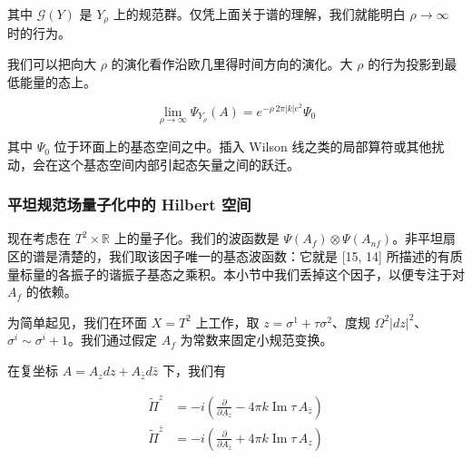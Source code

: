其中 $\mathcal{G}(Y)$ 是 $Y_\rho$ 上的规范群。仅凭上面关于谱的理解，我们就能明白 $\rho\to\infty$ 时的行为。

我们可以把向大 $\rho$ 的演化看作沿欧几里得时间方向的演化。大 $\rho$ 的行为投影到最低能量的态上。

\begin{equation}
  \lim_{\rho\to\infty}\Psi_{Y_\rho}(A)=e^{-\rho\,2\pi|k|e^2}\Psi_0
  \tag{2.193}
  \label{eq:2.193}
\end{equation}

其中 $\Psi_0$ 位于环面上的基态空间之中。插入 Wilson 线之类的局部算符或其他扰动，会在这个基态空间内部引起态矢量之间的跃迁。

\subsubsection*{平坦规范场量子化中的 Hilbert 空间} %

现在考虑在 $T^2\times\mathbb{R}$ 上的量子化。我们的波函数是 $\Psi(A_f)\otimes\Psi(A_{nf})$。非平坦扇区的谱是清楚的，我们取该因子唯一的基态波函数：它就是 [15, 14] 所描述的有质量标量的各振子的谐振子基态之乘积。本小节中我们丢掉这个因子，以便专注于对 $A_f$ 的依赖。

为简单起见，我们在环面 $X=T^2$ 上工作，取 $z=\sigma^1+\tau\sigma^2$、度规 $\Omega^2|dz|^2$、$\sigma^i\sim\sigma^i+1$。我们通过假定 $A_f$ 为常数来固定小规范变换。

在复坐标 $A=A_zdz+A_{\bar z}d\bar z$ 下，我们有

\begin{equation}
  \begin{aligned}
    \tilde\Pi^{z}&=-i\left(\frac{\partial}{\partial A_z}-4\pi k\operatorname{Im}\tau\,A_{\bar z}\right)\\
    \tilde\Pi^{\bar z}&=-i\left(\frac{\partial}{\partial A_{\bar z}}+4\pi k\operatorname{Im}\tau\,A_z\right)
  \end{aligned}
  \tag{2.194}
  \label{eq:2.194}
\end{equation}

